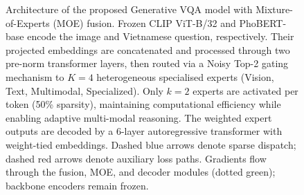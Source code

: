 
\begin{figure}[t]
\centering
\resizebox{\textwidth}{!}{%
%
}
\caption{%
  Architecture of the proposed Generative VQA model with Mixture-of-Experts (MOE) fusion.
  Frozen CLIP ViT-B/32 and PhoBERT-base encode the image and Vietnamese question, respectively.
  Their projected embeddings are concatenated and processed through two pre-norm transformer layers,
  then routed via a Noisy Top-2 gating mechanism to $K{=}4$ heterogeneous specialised experts
  (Vision, Text, Multimodal, Specialized).
  Only $k{=}2$ experts are activated per token (50\% sparsity),
  maintaining computational efficiency while enabling adaptive multi-modal reasoning.
  The weighted expert outputs are decoded by a 6-layer autoregressive transformer with weight-tied embeddings.
  Dashed blue arrows denote sparse dispatch; dashed red arrows denote auxiliary loss paths.
  Gradients flow through the fusion, MOE, and decoder modules (dotted green);
  backbone encoders remain frozen.%
}
\label{fig:architecture}
\end{figure}

